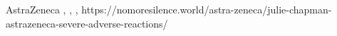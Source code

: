           {}
          {}
          {AstraZeneca}
          {}
          {
            ,
            ,
            ,
          }
          {https://nomoresilence.world/astra-zeneca/julie-chapman-astrazeneca-severe-adverse-reactions/}

